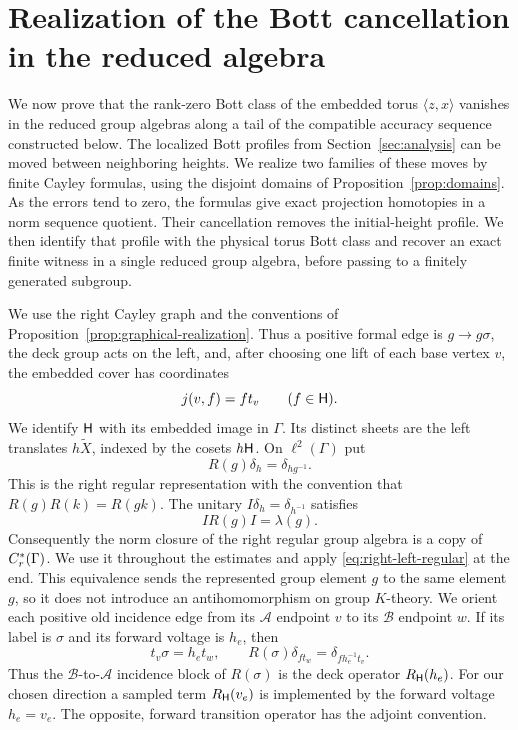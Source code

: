 \section{Realization of the Bott cancellation in the reduced algebra}
\label{sec:assembly}

We now prove that the rank-zero Bott class of the embedded torus
$\langle z,x\rangle$ vanishes in the reduced group algebras along a tail
of the compatible accuracy sequence constructed below.  The localized Bott
profiles from Section~\ref{sec:analysis} can be moved between neighboring heights.
We realize two families of these moves by finite Cayley formulas, using
the disjoint domains of Proposition~\ref{prop:domains}.  As the errors
tend to zero, the formulas give exact projection homotopies in a norm
sequence quotient.  Their cancellation removes the initial-height
profile.  We then identify that profile with the physical torus Bott
class and recover an exact finite witness in a single reduced group
algebra, before passing to a finitely generated subgroup.

We use the right Cayley graph and the conventions of
Proposition~\ref{prop:graphical-realization}.  Thus a positive formal edge is
$g\longrightarrow g\sigma$, the deck group acts on the left, and, after
choosing one lift of each base vertex $v$, the embedded cover has coordinates
\begin{equation}\label{eq:assembly-cover-coordinates}
 j(v,f)=f t_v\qquad(f\in\mathsf H).
\end{equation}
We identify $\mathsf H$ with its embedded image in $\Gamma$.  Its distinct sheets
are the left translates $h\widetilde X$, indexed by the cosets $h\mathsf H$.
On $\ell^2(\Gamma)$ put
\[
 R(g)\delta_h=\delta_{hg^{-1}}.
\]
This is the right regular representation with the convention that
$R(g)R(k)=R(gk)$.  The unitary $I\delta_h=\delta_{h^{-1}}$ satisfies
\begin{equation}\label{eq:right-left-regular}
 I R(g) I=\lambda(g).
\end{equation}
Consequently the norm closure of the right regular group algebra is a copy
of $C_r^*(\Gamma)$.  We use it throughout the estimates and apply
\eqref{eq:right-left-regular} at the end.  This equivalence sends the represented
group element $g$ to the same element $g$, so it does not introduce an
antihomomorphism on group $K$-theory.
We orient each positive old incidence edge from its $\mathscr A$ endpoint
$v$ to its $\mathscr B$ endpoint $w$.  If its label is $\sigma$ and its
forward voltage is $h_e$, then
\begin{equation}\label{eq:assembly-edge-direction}
 t_v\sigma=h_e t_w,
 \qquad
 R(\sigma)\delta_{f t_w}=\delta_{f h_e^{-1}t_v}.
\end{equation}
Thus the $\mathscr B$-to-$\mathscr A$ incidence block of $R(\sigma)$ is
the deck operator $R_{\mathsf H}(h_e)$.  For our chosen direction a sampled
term $R_{\mathsf H}(v_e)$ is implemented by the forward voltage $h_e=v_e$.
The opposite, forward transition operator has the adjoint convention.

